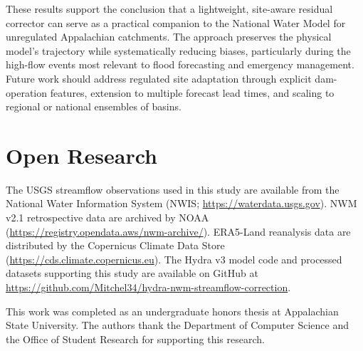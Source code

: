\documentclass[draft]{agujournal2019}
\begin{document}
These results support the conclusion that a lightweight, site-aware residual corrector can serve as a practical companion to the National Water Model for unregulated Appalachian catchments. The approach preserves the physical model's trajectory while systematically reducing biases, particularly during the high-flow events most relevant to flood forecasting and emergency management. Future work should address regulated site adaptation through explicit dam-operation features, extension to multiple forecast lead times, and scaling to regional or national ensembles of basins.


\section*{Open Research}
The USGS streamflow observations used in this study are available from the National Water Information System (NWIS; \url{https://waterdata.usgs.gov}). NWM v2.1 retrospective data are archived by NOAA (\url{https://registry.opendata.aws/nwm-archive/}). ERA5-Land reanalysis data are distributed by the Copernicus Climate Data Store (\url{https://cds.climate.copernicus.eu}). The Hydra v3 model code and processed datasets supporting this study are available on GitHub at \url{https://github.com/Mitchel34/hydra-nwm-streamflow-correction}.


\acknowledgments
This work was completed as an undergraduate honors thesis at Appalachian State University. The authors thank the Department of Computer Science and the Office of Student Research for supporting this research.



\end{document}
